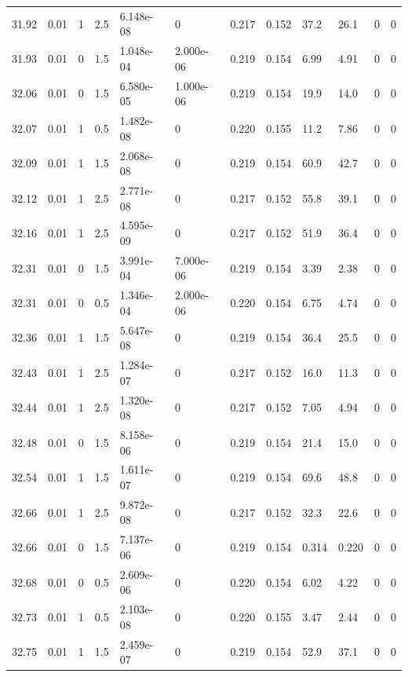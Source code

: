 \documentclass[preview]{standalone}
\begin{document}
{{{{{{{{{{{{{{{\begin{tabular}{L{1.2cm}C{1.2cm} C{0.3cm}C{0.5cm} C{1.4cm}C{1.4cm} C{1.4cm}C{1.4cm} C{1.6cm}C{1.6cm} C{1.6cm}C{1.6cm}}
  31.92  &  0.01  & 1     & 2.5 &  6.148e-08  & 0  &  0.217&   0.152& 37.2 & 26.1   &  0 & 0  \\ 
  31.93  &  0.01  & 0     & 1.5 &  1.048e-04  & 2.000e-06  &  0.219&   0.154& 6.99 & 4.91   &  0 & 0  \\ 
  32.06  &  0.01  & 0     & 1.5 &  6.580e-05  & 1.000e-06  &  0.219&   0.154& 19.9 & 14.0   &  0 & 0  \\ 
  32.07  &  0.01  & 1     & 0.5 &  1.482e-08  & 0  &  0.220&   0.155& 11.2 & 7.86   &  0 & 0  \\ 
  32.09  &  0.01  & 1     & 1.5 &  2.068e-08  & 0  &  0.219&   0.154& 60.9 & 42.7   &  0 & 0  \\ 
  32.12  &  0.01  & 1     & 2.5 &  2.771e-08  & 0  &  0.217&   0.152& 55.8 & 39.1   &  0 & 0  \\ 
  32.16  &  0.01  & 1     & 2.5 &  4.595e-09  & 0  &  0.217&   0.152& 51.9 & 36.4   &  0 & 0  \\ 
  32.31  &  0.01  & 0     & 1.5 &  3.991e-04  & 7.000e-06  &  0.219&   0.154& 3.39 & 2.38   &  0 & 0  \\ 
  32.31  &  0.01  & 0     & 0.5 &  1.346e-04  & 2.000e-06  &  0.220&   0.154& 6.75 & 4.74   &  0 & 0  \\ 
  32.36  &  0.01  & 1     & 1.5 &  5.647e-08  & 0  &  0.219&   0.154& 36.4 & 25.5   &  0 & 0  \\ 
  32.43  &  0.01  & 1     & 2.5 &  1.284e-07  & 0  &  0.217&   0.152& 16.0 & 11.3   &  0 & 0  \\ 
  32.44  &  0.01  & 1     & 2.5 &  1.320e-08  & 0  &  0.217&   0.152& 7.05 & 4.94   &  0 & 0  \\ 
  32.48  &  0.01  & 0     & 1.5 &  8.158e-06  & 0  &  0.219&   0.154& 21.4 & 15.0   &  0 & 0  \\ 
  32.54  &  0.01  & 1     & 1.5 &  1.611e-07  & 0  &  0.219&   0.154& 69.6 & 48.8   &  0 & 0  \\ 
  32.66  &  0.01  & 1     & 2.5 &  9.872e-08  & 0  &  0.217&   0.152& 32.3 & 22.6   &  0 & 0  \\ 
  32.66  &  0.01  & 0     & 1.5 &  7.137e-06  & 0  &  0.219&   0.154& 0.314 & 0.220   &  0 & 0  \\ 
  32.68  &  0.01  & 0     & 0.5 &  2.609e-06  & 0  &  0.220&   0.154& 6.02 & 4.22   &  0 & 0  \\ 
  32.73  &  0.01  & 1     & 0.5 &  2.103e-08  & 0  &  0.220&   0.155& 3.47 & 2.44   &  0 & 0  \\ 
  32.75  &  0.01  & 1     & 1.5 &  2.459e-07  & 0  &  0.219&   0.154& 52.9 & 37.1   &  0 & 0  \\ 

\end{tabular}}}}}}}}}}}}}}}}
\end{document}
